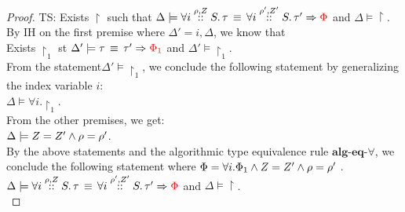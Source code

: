 \begin{proof}
  TS: Exists $\restriction$ such that $\Delta \models \eqv{\tforall{\dmap}{\nnatA}{i} \type   }{\tforall{\dmap'}{\nnatA'}{i} \type' }{ \restriction}$ and $\Delta \models \restriction$.\\
  By IH on the first premise where $\Delta' = i,\Delta$, we know that \\
Exists $\restriction_1 $ st  $\Delta' \models \eqv{\type   }{\type' }{ \restriction_1}$ and $\Delta' \models \restriction_1$. \\
From the statement$\Delta' \models \restriction_1$, we conclude the following statement by generalizing the index variable $i$:\\
$\Delta \models \forall i. \restriction_1  $.\\
From the other premises, we get:\\
  $\Delta \models  \nnatA = \nnatA' \land \dmap = \dmap'$.\\
  By the above statements and the algorithmic type equivalence rule $\textbf{alg-eq-$\forall$}$, we conclude the following statement where $\restriction = \forall i. \restriction_1  \land \nnatA = \nnatA' \land \dmap = \dmap'$ .\\
  $\Delta \models \eqv{\tforall{\dmap}{\nnatA}{i} \type   }{\tforall{\dmap'}{\nnatA'}{i} \type' }{ \restriction}$ and $\Delta \models \restriction$.\\
\end{proof}

